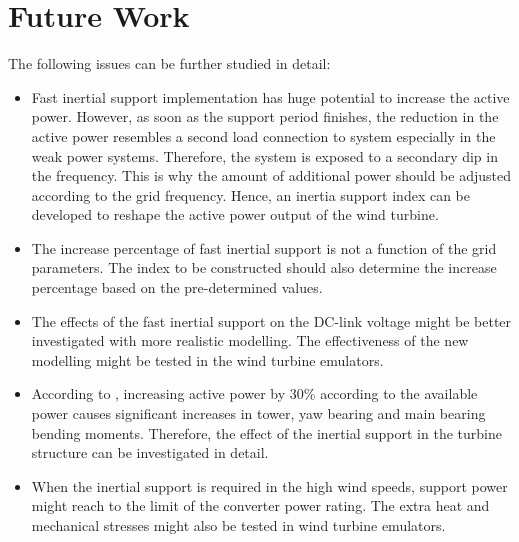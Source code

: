 \section{Future Work}
The following issues can be further studied in detail:
\begin{itemize}
	\item Fast inertial support implementation has huge potential to increase the active power. However, as soon as the support period finishes, the reduction in the active power resembles a second load connection to system especially in the weak power systems. Therefore, the system is exposed to a secondary dip in the frequency. This is why the amount of additional power should be adjusted according to the grid frequency. Hence, an inertia support index can be developed to reshape the active power output of the wind turbine. 
	\item The increase percentage of fast inertial support is not a function of the grid parameters. The index to be constructed should also determine the increase percentage based on the pre-determined values. 
	\item The effects of the fast inertial support on the DC-link voltage might be better investigated with more realistic modelling. The effectiveness of the new modelling might be tested in the wind turbine emulators. 
	\item According to \cite{Altin2018}, increasing active power by 30\% according to the available power causes significant increases in  tower, yaw bearing and main bearing bending moments. Therefore, the effect of the inertial support in the turbine structure can be investigated in detail. 
	\item When the inertial support is required in the high wind speeds, support power might reach to the limit of the converter power rating. The extra heat and mechanical stresses might also be tested in wind turbine emulators. 
\end{itemize}